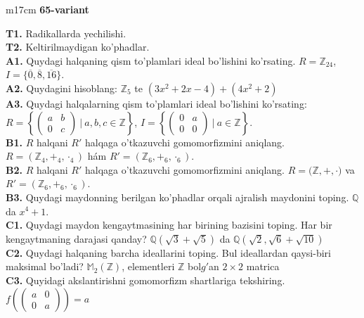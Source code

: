 \documentclass{article}
\begin{document}
\begin{tabular}{m{17cm}}
\textbf{65-variant}
\newline

\textbf{T1.} Radikallarda yechilishi. \\
\textbf{T2.} Keltirilmaydigan ko'phadlar. \\
\textbf{A1.} Quydagi halqaning qism to'plamlari ideal bo'lishini ko'rsating.
\(R = \mathbb{Z}_{24}\), \(I = \{\overline{0},\overline{8},\overline{16}\}\). \\
\textbf{A2.} Quydagini hisoblang:
\(\mathbb{Z}_{5}\) te \(\left( 3x^{2} + 2x - 4 \right) + \left( 4x^{2} + 2 \right)\) \\
\textbf{A3.} Quydagi halqalarning qism to'plamlari ideal bo'lishini ko'rsating: \(R = \left\{ \begin{pmatrix}
a & b \\
0 & c
\end{pmatrix}\ |\ a,b,c \in \mathbb{Z} \right\}\), \(I = \left\{ \begin{pmatrix}
0 & a \\
0 & 0
\end{pmatrix}\ |\ a \in \mathbb{Z} \right\}\). \\
\textbf{B1.} \(R\) halqani \(R'\) halqaga o'tkazuvchi gomomorfizmini aniqlang.
\(R = (\mathbb{Z}_{4}, +_{4}, \cdot_{4})\) hám \(R' = (\mathbb{Z}_{6}, +_{6}, \cdot_{6})\). \\
\textbf{B2.} \(R\) halqani \(R'\) halqaga o'tkazuvchi gomomorfizmini aniqlang.
\(R\mathbb{= (Z,} + , \cdot )\) va \(R' = (\mathbb{Z}_{6}, +_{6}, \cdot_{6})\). \\
\textbf{B3.} Quydagi maydonning berilgan ko'phadlar orqali ajralish maydonini toping.
\(\mathbb{Q}\) da \(x^{4} + 1\). \\
\textbf{C1.} Quydagi maydon kengaytmasining har birining bazisini toping. Har bir kengaytmaning darajasi qanday?
\(\mathbb{Q}\left( \sqrt{3} + \sqrt{5} \right)\) da \(\mathbb{Q}\left( \sqrt{2},\sqrt{6} + \sqrt{10} \right)\) \\
\textbf{C2.} Quydagi halqaning barcha ideallarini toping. Bul ideallardan qaysi-biri maksimal bo'ladi?
\(\mathbb{M}_{2}\left( \mathbb{Z} \right)\), elementleri \(\mathbb{Z}\) bol\(g'\)an \(2 \times 2\) matrica \\
\textbf{C3.} Quyidagi akslantirishni gomomorfizm shartlariga tekshiring. \(f\left( \begin{pmatrix}
a & 0 \\
0 & a
\end{pmatrix} \right) = a\) \\

\end{tabular}
\vspace{1cm}
\end{document}
